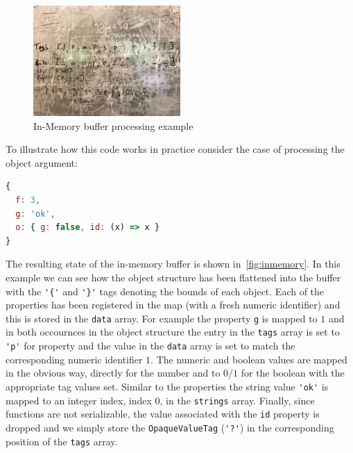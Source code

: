 \begin{figure}
    \centering
    \includegraphics[width=0.5\textwidth]{Figures/InMemoryExample}
    \caption{In-Memory buffer processing example}
    \label{fig:inmemory}
\end{figure}

To illustrate how this code works in practice consider the case of processing the 
object argument:

\begin{lstlisting}[language=JavaScript,basicstyle=\scriptsize,numbers=none]
{
  f: 3,
  g: 'ok',
  o: { g: false, id: (x) => x }
}
\end{lstlisting}

The resulting state of the in-memory buffer is shown in~\autoref{fig:inmemory}. 
In this example we can see how the object structure has been flattened into 
the buffer with the \lstinline!'{'! and \lstinline!'}'! tags denoting the bounds 
of each object. Each of the properties has been registered in the map (with a fresh 
numeric identifier) and this is stored in the \texttt{data} array. For example the 
property \lstinline!g! is mapped to $1$ and in both occournces in the object 
structure the entry in the \texttt{tags} array is set to \lstinline!'p'! for 
property and the value in the \texttt{data} array is set to match the corresponding 
numeric identifier $1$. The numeric and boolean values are mapped in the obvious 
way, directly for the number and to $0$/$1$ for the boolean with the appropriate 
tag values set. Similar to the properties the string value \lstinline!'ok'! is 
mapped to an integer index, index $0$, in the \texttt{strings} array. Finally, 
since functions are not serializable, the value associated with the \lstinline!id! 
property is dropped and we simply store the \texttt{OpaqueValueTag} (\lstinline!'?'!) 
in the corresponding position of the \texttt{tags} array.

